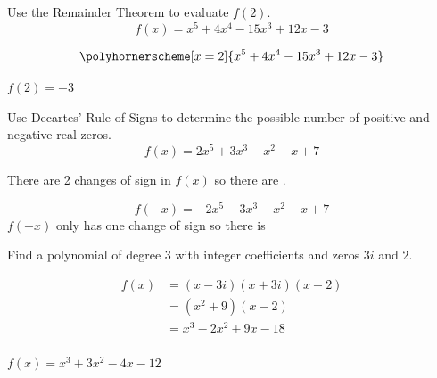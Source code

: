 \documentclass[fleqn,addpoints]{exam}
\begin{document}
\begin{questions}
\begin{solution}
    \end{solution}

    \ifprintanswers
      \pagebreak
    \fi

    \question[5] Use the Remainder Theorem to evaluate $f(2)$.
      \[
        f(x) = x^5 + 4x^4 - 15x^3 + 12x - 3
      \]

      \begin{solution}
        \[
          \polyhornerscheme[x = 2]{x^5 + 4x^4 - 15x^3 + 12x - 3}
        \]

        $\boxed{f(2) = -3}$

      \end{solution}

    \question[5] Use Decartes' Rule of Signs to determine the possible number of positive and negative real zeros.
      \[
        f(x) = 2x^5 + 3x^3 - x^2 - x + 7
      \]

      \begin{solution}
        There are 2 changes of sign in $f(x)$ so there are .

        \[
          f(-x) = -2x^5 - 3x^3 - x^2 + x + 7
        \]
        $f(-x)$ only has one change of sign so there is 

      \end{solution}

    \ifprintanswers
      \pagebreak
    \fi

    \question[7] Find a polynomial of degree 3 with integer coefficients and zeros $3i$ and $2$.
    \begin{solution}
      \begin{align*}
        f(x) &= (x - 3i)(x + 3i)(x - 2) \\
             &= (x^2 + 9)(x - 2) \\
             &= \boxed{x^3 - 2x^2 + 9x - 18} \\
      \end{align*}
    \end{solution}

    \question $f(x) = x^3 + 3x^2 - 4x - 12$
      \label{graph1}

\end{questions}
\end{document}
